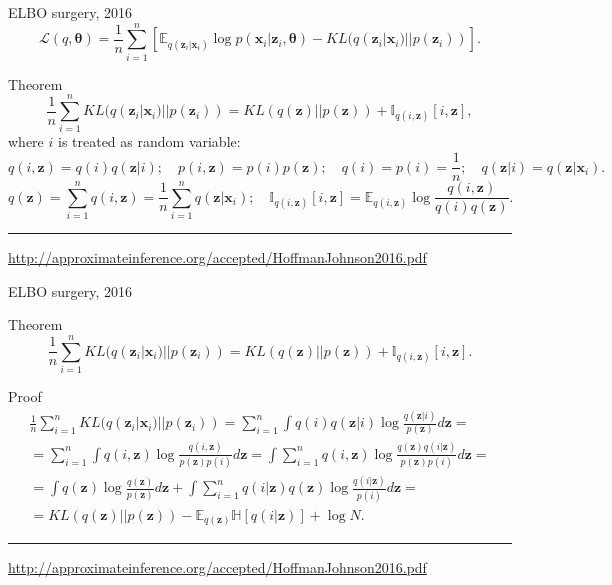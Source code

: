 \documentclass{beamer}
\newcommand{\bx}{\mathbf{x}}
\newcommand{\bz}{\mathbf{z}}
\newcommand{\btheta}{\boldsymbol{\theta}}
\begin{document}
\begin{frame}{ELBO surgery, 2016}
\vspace{-0.3cm}
\[
    \mathcal{L}(q, \btheta) = \frac{1}{n} \sum_{i=1}^n \left[ \mathbb{E}_{q(\bz_i | \bx_i)} \log p(\bx_i | \bz_i, \btheta) - KL(q(\bz_i | \bx_i) || p(\bz_i)) \right].
\]
\vspace{-0.3cm}
\begin{block}{Theorem}
\[
    \frac{1}{n} \sum_{i=1}^n KL(q(\bz_i | \bx_i) || p(\bz_i)) = KL(q(\bz) || p(\bz)) + \mathbb{I}_{q(i, \bz)} [i, \bz],
\]
where $i$ is treated as random variable:
\footnotesize{
\[
    q(i, \bz) = q(i) q(\bz | i); \quad p(i, \bz) = p(i) p(\bz); \quad 
    q(i) = p(i) = \frac{1}{n}; \quad q(\bz | i) = q(\bz | \bx_i).
\]
\[
    q(\bz) = \sum_{i=1}^n q(i, \bz) = \frac{1}{n} \sum_{i=1}^n q(\bz | \bx_i); \quad  \mathbb{I}_{q(i, \bz)} [i, \bz] = \mathbb{E}_{q(i, \bz)} \log \frac{q(i, \bz)}{q(i)q(\bz)}.
\]
}
\end{block}

\vfill
\hrule\medskip
{\scriptsize \href{http://approximateinference.org/accepted/HoffmanJohnson2016.pdf}{http://approximateinference.org/accepted/HoffmanJohnson2016.pdf}}
\end{frame}
\begin{frame}{ELBO surgery, 2016}
\begin{block}{Theorem}
\[
    \frac{1}{n} \sum_{i=1}^n KL(q(\bz_i | \bx_i) || p(\bz_i)) = KL(q(\bz) || p(\bz)) + \mathbb{I}_{q(i, \bz)} [i, \bz].
\]
\end{block}
\begin{block}{Proof}
\vspace{-0.3cm}
{\footnotesize
\begin{multline*}
    \frac{1}{n} \sum_{i=1}^n KL(q(\bz_i | \bx_i) || p(\bz_i)) = \sum_{i=1}^n \int q(i) q(\bz | i) \log \frac{q(\bz | i)}{p(\bz)} d \bz = \\
    = \sum_{i=1}^n \int q(i, \bz) \log \frac{q(i, \bz)}{p(\bz)p(i)} d \bz =
    \int \sum_{i=1}^n q(i, \bz) \log \frac{ q (\bz) q(i | \bz) }{p(\bz) p(i) } d \bz = \\
    = \int q(\bz) \log \frac{q(\bz)}{p(\bz)} d\bz + \int \sum_{i=1}^n q(i | \bz) q(\bz) \log \frac{q(i | \bz)}{p(i)} d \bz = \\
    = KL (q(\bz) || p(\bz)) - \mathbb{E}_{q(\bz)} \mathbb{H} \left[q(i | \bz)  \right] + \log N.
\end{multline*}
}
\end{block}
\vfill
\hrule\medskip
{\scriptsize \href{http://approximateinference.org/accepted/HoffmanJohnson2016.pdf}{http://approximateinference.org/accepted/HoffmanJohnson2016.pdf}}
\end{frame}
\end{document}
